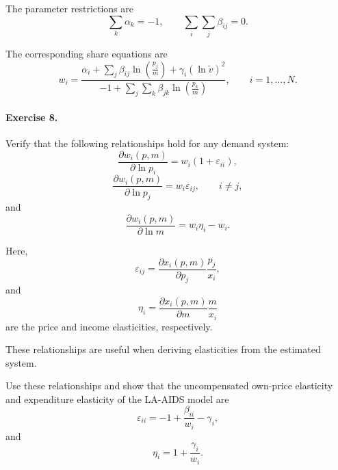 The parameter restrictions are
\[
\sum_k \alpha_k=-1,
\qquad
\sum_i\sum_j \beta_{ij}=0.
\]

The corresponding share equations are
\[
w_i
=
\frac{
\alpha_i
+
\sum_j \beta_{ij}
\ln\left(\frac{p_j}{m}\right)
+
\gamma_i(\ln \tilde v)^2
}{
-1
+
\sum_j\sum_k
\beta_{jk}
\ln\left(\frac{p_k}{m}\right)
},
\qquad
i=1,\dots,N.
\]

\paragraph{Exercise 8.}
Verify that the following relationships hold for any demand system:
\[
\frac{\partial w_i(p,m)}{\partial \ln p_i}
=
w_i(1+\varepsilon_{ii}),
\]
\[
\frac{\partial w_i(p,m)}{\partial \ln p_j}
=
w_i\varepsilon_{ij},
\qquad
i\ne j,
\]
and
\[
\frac{\partial w_i(p,m)}{\partial \ln m}
=
w_i\eta_i-w_i.
\]

Here,
\[
\varepsilon_{ij}
=
\frac{\partial x_i(p,m)}{\partial p_j}
\frac{p_j}{x_i},
\]
and
\[
\eta_i
=
\frac{\partial x_i(p,m)}{\partial m}
\frac{m}{x_i}
\]
are the price and income elasticities, respectively.

These relationships are useful when deriving elasticities from the estimated system.

Use these relationships and show that the uncompensated own-price elasticity and expenditure elasticity of the LA-AIDS model are
\[
\varepsilon_{ii}
=
-1
+
\frac{\beta_{ii}}{w_i}
-
\gamma_i,
\]
and
\[
\eta_i
=
1+\frac{\gamma_i}{w_i}.
\]




